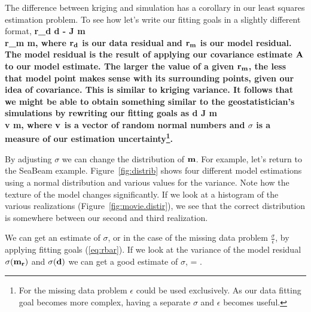 %
%
%
%
%
%
%
%
The difference between kriging and simulation has a corollary in our
least squares estimation problem. To see how let's write
our fitting goals in a slightly different format,
\beqa
\bf r_d \pox \bf d  - \bf J  \bf m  \nonumber \\ 
\bf r_m \pox \epsilon \reg \bf m\label{eq:rbar},
\eeqa
where $\bf r_d$ is our data residual and $\bf r_m$ is our model
residual.  The model residual is the result of applying our
covariance estimate $\bf A$ to our model estimate.  The larger
the value of a given $\bf r_m$, the less that model point makes
sense with its surrounding points, given our idea of covariance.
This is similar to kriging variance.
It follows that we might be able to obtain something similar
to the geostatistician's simulations by rewriting our fitting
goals as 
\beqa
\bf d \pox  \bf J  \bf m  \nonumber \\ 
\sigma \bf  v \pox \epsilon \reg \bf m\label{eq:rand},
\eeqa
where $\bf v$ is a vector of random normal numbers and $\sigma$ is 
a measure of our estimation uncertainty\footnote{For the missing
data problem $\epsilon$ could be used exclusively.
As  our data fitting goal becomes more complex,
having a separate  $\sigma$ and $\epsilon$ becomes useful.}.

By adjusting $\sigma$
we can change the distribution of
$\bf m$. For example, let's return to the SeaBeam example.
Figure~\ref{fig:distrib} shows four different model estimations
using a normal distribution and various values for the variance.
Note how the texture of the model changes significantly. If we look
at a histogram of the various realizations (Figure~\ref{fig:movie.distir}),
we see that the correct
distribution is somewhere between our second and third realization.
\par 
We can get an estimate of $\sigma$, or in the case of the missing
data problem $\frac{\sigma}{\epsilon}$, by applying fitting goals 
(\ref{eq:rbar}). If we look at the variance of the model residual $\sigma(\bf m_r)$  and 
$\sigma(\bf d)$ we can get a good estimate of $\sigma$,
\beq
\sigma =  \label{eq:sigma.calc} .
\eeq

%

